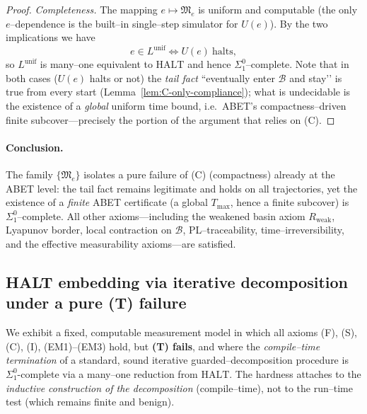 \documentclass[12pt]{article}
\theoremstyle{definition}
\theoremstyle{plain}
\begin{document}
\begin{proof}
\smallskip
\emph{Completeness.}
The mapping \(e\mapsto \mathfrak M_e\) is uniform and computable (the only
\(e\)–dependence is the built–in single–step simulator for \(U(e)\)).
By the two implications we have
\[
  e\in L^{\mathrm{unif}} \iff U(e)\ \text{halts},
\]
so \(L^{\mathrm{unif}}\) is many–one equivalent to \(\mathrm{HALT}\) and hence
\(\Sigma^0_1\)–complete.  Note that in both cases (\(U(e)\) halts or not) the
\emph{tail fact} “eventually enter \(\mathcal B\) and stay’’ is true from every
start (Lemma~\ref{lem:C-only-compliance}); what is undecidable is the existence
of a \emph{global} uniform time bound, i.e.\ ABET’s compactness–driven finite
subcover—precisely the portion of the argument that relies on (C).
\end{proof}

\paragraph{Conclusion.}
The family \(\{\mathfrak M_e\}\) isolates a pure failure of \textup{(C)} (compactness)
already at the ABET level: the tail fact remains legitimate and holds on all
trajectories, yet the existence of a \emph{finite} ABET certificate (a global
\(T_{\max}\), hence a finite subcover) is \(\Sigma^0_1\)–complete.  All other
axioms—including the weakened basin axiom \(R_{\text{weak}}\), Lyapunov border,
local contraction on \(\mathcal B\), PL–traceability, time–irreversibility, and
the effective measurability axioms—are satisfied.




\subsection{HALT embedding via iterative decomposition under a pure (T) failure}
\label{subsec:halt-embedding-pure-T}

We exhibit a fixed, computable measurement model in which all axioms (F), (S), (C), (I), (EM1)–(EM3) hold, but \textbf{(T) fails}, and where the \emph{compile–time termination} of a standard, sound iterative guarded–decomposition procedure is \(\Sigma^0_1\)-complete via a many–one reduction from \(\mathrm{HALT}\).
The hardness attaches to the \emph{inductive construction of the decomposition} (compile–time), not to the run–time test (which remains finite and benign).
\end{document}
